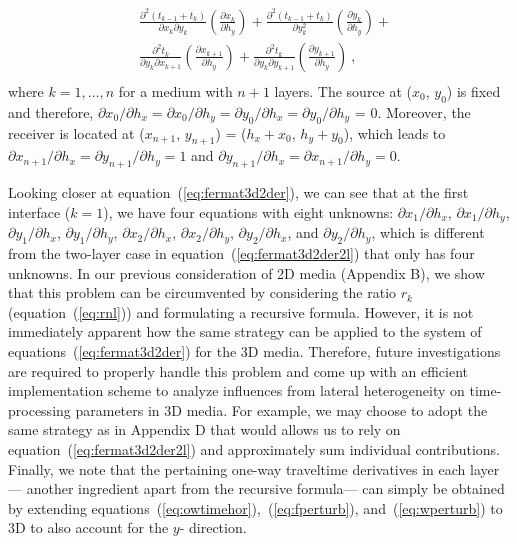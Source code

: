 \begin{align}
    & \frac{\partial^2 (t_{k-1} + t_k)}{\partial x_k \partial y_k} \left( \frac{\partial x_k}{\partial h_y}\right) + \frac{\partial^2 (t_{k-1} + t_k)}{\partial y_k^2} \left( \frac{\partial y_k}{\partial h_y}\right) + \\ \nonumber
    & \frac{\partial^2 t_k}{\partial y_k \partial x_{k+1}}\left( \frac{\partial x_{k+1}}{\partial h_y}\right)+ \frac{\partial^2 t_k}{\partial y_k \partial y_{k+1}}\left( \frac{\partial y_{k+1}}{\partial h_y}\right)~,\\ \nonumber
\end{align}
where $k = 1, \dots, n$ for a medium with $n+1$ layers. The source at ($x_0$, $y_0$) is fixed and therefore, $\partial x_0/\partial h_x = \partial x_0/\partial h_y = \partial y_0/\partial h_x = \partial y_0/\partial h_y$ = 0. Moreover, the receiver is located at ($x_{n+1}$, $y_{n+1}$) =  ($h_x + x_0$, $h_y + y_0$), which leads to $\partial x_{n+1}/\partial h_x = \partial y_{n+1}/\partial h_y = 1$ and $\partial y_{n+1}/\partial h_x = \partial x_{n+1}/\partial h_y = 0$. 

Looking closer at equation~(\ref{eq:fermat3d2der}), we can see that at the first interface ($k=1$), we have four equations with eight unknowns: $\partial x_1/\partial h_x$, $\partial x_1/\partial h_y$, $\partial y_1/\partial h_x$, $\partial y_1/\partial h_y$, $\partial x_2/\partial h_x$, $\partial x_2/\partial h_y$, $\partial y_2/\partial h_x$, and $\partial y_2/\partial h_y$, which is different from the two-layer case in equation~(\ref{eq:fermat3d2der2l}) that only has four unknowns. In our previous consideration of 2D media (Appendix B), we show that this problem can be circumvented by considering the ratio $r_k$ (equation~(\ref{eq:rnl})) and formulating a recursive formula. However, it is not immediately apparent how the same strategy can be applied to the system of equations~(\ref{eq:fermat3d2der}) for the 3D media. Therefore, future investigations are required to properly handle this problem and come up with an efficient implementation scheme to analyze influences from lateral heterogeneity on time-processing parameters in 3D media. For example, we may choose to adopt the same strategy as in Appendix D that would allows us to rely on equation~(\ref{eq:fermat3d2der2l}) and approximately sum individual contributions. Finally, we note that the pertaining one-way traveltime derivatives in each layer --- another ingredient apart from the recursive formula--- can simply be obtained by extending equations~(\ref{eq:owtimehor}),~(\ref{eq:fperturb}), and~(\ref{eq:wperturb}) to 3D to also account for the $y$- direction. 


\onecolumn


